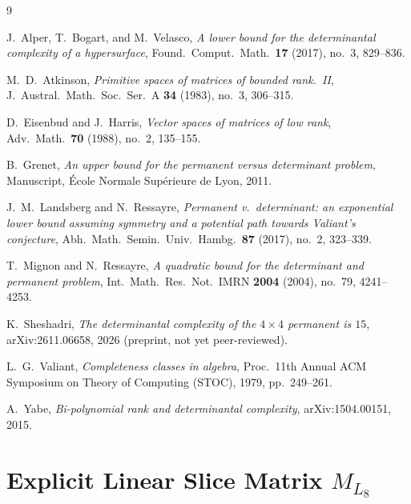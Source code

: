\documentclass[11pt,a4paper]{article}
\theoremstyle{definition}
\begin{document}
\begin{thebibliography}{9}

J.~Alper, T.~Bogart, and M.~Velasco,
\emph{A lower bound for the determinantal complexity of a hypersurface},
Found.\ Comput.\ Math.\ \textbf{17} (2017), no.~3, 829--836.

M.~D.~Atkinson,
\emph{Primitive spaces of matrices of bounded rank.~II},
J.\ Austral.\ Math.\ Soc.\ Ser.~A \textbf{34} (1983), no.~3, 306--315.

D.~Eisenbud and J.~Harris,
\emph{Vector spaces of matrices of low rank},
Adv.\ Math.\ \textbf{70} (1988), no.~2, 135--155.

B.~Grenet,
\emph{An upper bound for the permanent versus determinant problem},
Manuscript, \'Ecole Normale Sup\'erieure de Lyon, 2011.

J.~M.~Landsberg and N.~Ressayre,
\emph{Permanent v.\ determinant: an exponential lower bound assuming symmetry and a potential path towards Valiant's conjecture},
Abh.\ Math.\ Semin.\ Univ.\ Hambg.\ \textbf{87} (2017), no.~2, 323--339.

T.~Mignon and N.~Ressayre,
\emph{A quadratic bound for the determinant and permanent problem},
Int.\ Math.\ Res.\ Not.\ IMRN \textbf{2004} (2004), no.~79, 4241--4253.

K.~Sheshadri,
\emph{The determinantal complexity of the $4 \times 4$ permanent is $15$},
arXiv:2611.06658, 2026 (preprint, not yet peer-reviewed).

L.~G.~Valiant,
\emph{Completeness classes in algebra},
Proc.\ 11th Annual ACM Symposium on Theory of Computing (STOC), 1979, pp.~249--261.

A.~Yabe,
\emph{Bi-polynomial rank and determinantal complexity},
arXiv:1504.00151, 2015.

\end{thebibliography}

\appendix
\section{Explicit Linear Slice Matrix $M_{L_8}$}\label{app:ml8}
\end{document}
